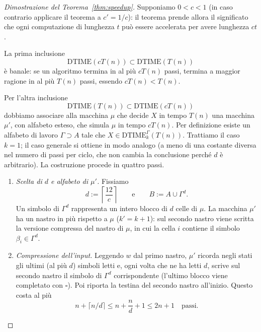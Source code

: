 \begin{proof}[Dimostrazione del Teorema~\ref{thm:speedup}]
Supponiamo $0<c<1$ (in caso contrario applicare il teorema a $c'=1/c$): il teorema prende allora il significato che ogni computazione di lunghezza $t$ può essere accelerata per avere lunghezza $ct$.

La prima inclusione
\[
\mathrm{DTIME}(cT(n))\subset \mathrm{DTIME}(T(n))
\]
è banale: se un algoritmo termina in al più $cT(n)$ passi, termina a maggior ragione in al più $T(n)$ passi, essendo $cT(n)<T(n)$.

Per l'altra inclusione
\[
\mathrm{DTIME}(T(n))\subset \mathrm{DTIME}(cT(n))
\]
dobbiamo associare alla macchina $\mu$ che decide $X$ in tempo $T(n)$ una macchina $\mu'$, con alfabeto esteso, che simula $\mu$ in tempo $cT(n)$. Per definizione esiste un alfabeto di lavoro $\Gamma\supset A$ tale che $X\in\mathrm{DTIME}^{\Gamma}_k(T(n))$. Trattiamo il caso $k=1$; il caso generale si ottiene in modo analogo (a meno di una costante diversa nel numero di passi per ciclo, che non cambia la conclusione perché $d$ è arbitrario). La costruzione procede in quattro passi.

\begin{enumerate}
    \item[1.] \emph{Scelta di $d$ e alfabeto di $\mu'$.} Fissiamo
    \[
    d:=\left\lceil \frac{12}{c}\right\rceil
    \qquad\text{e}\qquad
    B:=A\cup\Gamma^d .
    \]
    Un simbolo di $\Gamma^d$ rappresenta un intero blocco di $d$ celle di $\mu$. La macchina $\mu'$ ha un nastro in più rispetto a $\mu$ ($k'=k+1$): sul secondo nastro viene scritta la versione compressa del nastro di $\mu$, in cui la cella $i$ contiene il simbolo $\beta_i\in\Gamma^d$.

    \item[2.] \emph{Compressione dell'input.} Leggendo $w$ dal primo nastro, $\mu'$ ricorda negli stati gli ultimi (al più $d$) simboli letti e, ogni volta che ne ha letti $d$, scrive sul secondo nastro il simbolo di $\Gamma^d$ corrispondente (l'ultimo blocco viene completato con $\square$). Poi riporta la testina del secondo nastro all'inizio. Questo costa al più
    \[
    n+\lceil n/d\rceil\leq n+\frac{n}{d}+1\leq 2n+1\quad\text{passi.}
    \]


\end{enumerate}
\end{proof}
